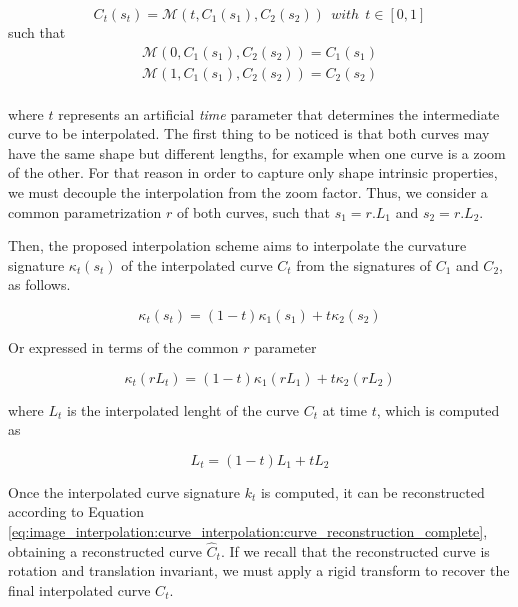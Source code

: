 \documentclass{ipol}
\begin{document}
\begin{equation}
C_t(s_t)=\mathcal{M}(t,C_1(s_1),C_2(s_2)) \:\: with \:\: t\in[0,1] 
\end{equation}
such that 
\begin{equation*}
\begin{array}{l}
\mathcal{M}(0,C_1(s_1),C_2(s_2))=C_1(s_1) \\
\mathcal{M}(1,C_1(s_1),C_2(s_2))=C_2(s_2) \\
\end{array}
\end{equation*}

where $t$ represents an artificial \emph{time} parameter that determines the intermediate curve to be interpolated.
The first thing to be noticed is that both curves may have the same shape but different lengths, for example when one curve is a zoom of the other. For that reason in order to capture only shape intrinsic properties, we must decouple the interpolation from the zoom factor. Thus, we consider a common parametrization $r$ of both curves, such that $s_1=r.L_1$ and $s_2=r.L_2$.

Then, the proposed interpolation scheme aims to interpolate the curvature signature $\kappa_t(s_t)$ of the interpolated curve $C_t$ from the signatures of $C_1$ and $C_2$, as follows.

\begin{equation}
 \kappa_t(s_t)=(1-t)\kappa_1(s_1)+t\kappa_2(s_2)
\end{equation}

Or expressed in terms of the common $r$ parameter

\begin{equation}
\kappa_t(rL_t)=(1-t)\kappa_1(rL_1)+t\kappa_2(rL_2)
\label{eq:curve_interpolation:curvature_cross_dissolve}
\end{equation}

where $L_t$ is the interpolated lenght of the curve $C_t$ at time $t$, which is computed as

\begin{equation}
L_t=(1-t)L_1+tL_2
\label{eq:curve_interpolation:interpolated_length}
\end{equation}

Once the interpolated curve signature $k_t$ is computed, it can be reconstructed according to Equation \ref{eq:image_interpolation:curve_interpolation:curve_reconstruction_complete}, obtaining a reconstructed curve $\hat{C}_t$. If we recall that the reconstructed curve is rotation and translation invariant, we must apply a rigid transform to recover the final interpolated curve $C_t$.
\end{document}
